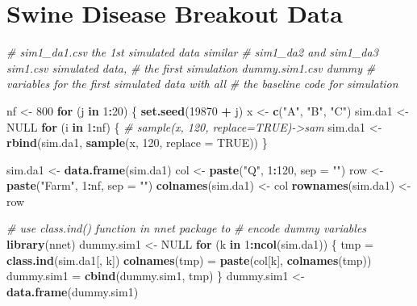 \documentclass[12pt,]{krantz}
\makeatletter
\newenvironment{Shaded}{\begin{snugshade}}{\end{snugshade}}
\newcommand{\CommentTok}[1]{\textcolor[rgb]{0.37,0.37,0.37}{\textit{#1}}}
\newcommand{\ControlFlowTok}[1]{\textcolor[rgb]{0.27,0.27,0.27}{\textbf{#1}}}
\newcommand{\DataTypeTok}[1]{\textcolor[rgb]{0.27,0.27,0.27}{#1}}
\newcommand{\DecValTok}[1]{\textcolor[rgb]{0.06,0.06,0.06}{#1}}
\newcommand{\KeywordTok}[1]{\textcolor[rgb]{0.27,0.27,0.27}{\textbf{#1}}}
\newcommand{\NormalTok}[1]{#1}
\newcommand{\OperatorTok}[1]{\textcolor[rgb]{0.43,0.43,0.43}{\textbf{#1}}}
\newcommand{\OtherTok}[1]{\textcolor[rgb]{0.37,0.37,0.37}{#1}}
\newcommand{\StringTok}[1]{\textcolor[rgb]{0.5,0.5,0.5}{#1}}
\newenvironment{kframe}{%
\medskip{}
\setlength{\fboxsep}{.8em}
 \def\at@end@of@kframe{}%
 \ifinner\ifhmode%
  \def\at@end@of@kframe{\end{minipage}}%
  \begin{minipage}{\columnwidth}%
 \fi\fi%
 \def\FrameCommand##1{\hskip\@totalleftmargin \hskip-\fboxsep
 \colorbox{shadecolor}{##1}\hskip-\fboxsep
     \hskip-\linewidth \hskip-\@totalleftmargin \hskip\columnwidth}%
 \MakeFramed {\advance\hsize-\width
   \@totalleftmargin\z@ \linewidth\hsize
   \@setminipage}}%
 {\par\unskip\endMakeFramed%
 \at@end@of@kframe}
\renewenvironment{Shaded}{\begin{kframe}}{\end{kframe}}
\makeatother
\begin{document}
\hypertarget{swine-disease-breakout-data}{%
\section{Swine Disease Breakout Data}\label{swine-disease-breakout-data}}

\begin{Shaded}
\begin{Highlighting}[]
\CommentTok{# sim1_da1.csv the 1st simulated data similar}
\CommentTok{# sim1_da2 and sim1_da3 sim1.csv simulated data,}
\CommentTok{# the first simulation dummy.sim1.csv dummy}
\CommentTok{# variables for the first simulated data with all}
\CommentTok{# the baseline code for simulation}

\NormalTok{nf <-}\StringTok{ }\DecValTok{800}
\ControlFlowTok{for}\NormalTok{ (j }\ControlFlowTok{in} \DecValTok{1}\OperatorTok{:}\DecValTok{20}\NormalTok{) \{}
    \KeywordTok{set.seed}\NormalTok{(}\DecValTok{19870} \OperatorTok{+}\StringTok{ }\NormalTok{j)}
\NormalTok{    x <-}\StringTok{ }\KeywordTok{c}\NormalTok{(}\StringTok{"A"}\NormalTok{, }\StringTok{"B"}\NormalTok{, }\StringTok{"C"}\NormalTok{)}
\NormalTok{    sim.da1 <-}\StringTok{ }\OtherTok{NULL}
    \ControlFlowTok{for}\NormalTok{ (i }\ControlFlowTok{in} \DecValTok{1}\OperatorTok{:}\NormalTok{nf) \{}
        \CommentTok{# sample(x, 120, replace=TRUE)->sam}
\NormalTok{        sim.da1 <-}\StringTok{ }\KeywordTok{rbind}\NormalTok{(sim.da1, }\KeywordTok{sample}\NormalTok{(x, }\DecValTok{120}\NormalTok{, }\DataTypeTok{replace =} \OtherTok{TRUE}\NormalTok{))}
\NormalTok{    \}}
    
\NormalTok{    sim.da1 <-}\StringTok{ }\KeywordTok{data.frame}\NormalTok{(sim.da1)}
\NormalTok{    col <-}\StringTok{ }\KeywordTok{paste}\NormalTok{(}\StringTok{"Q"}\NormalTok{, }\DecValTok{1}\OperatorTok{:}\DecValTok{120}\NormalTok{, }\DataTypeTok{sep =} \StringTok{""}\NormalTok{)}
\NormalTok{    row <-}\StringTok{ }\KeywordTok{paste}\NormalTok{(}\StringTok{"Farm"}\NormalTok{, }\DecValTok{1}\OperatorTok{:}\NormalTok{nf, }\DataTypeTok{sep =} \StringTok{""}\NormalTok{)}
    \KeywordTok{colnames}\NormalTok{(sim.da1) <-}\StringTok{ }\NormalTok{col}
    \KeywordTok{rownames}\NormalTok{(sim.da1) <-}\StringTok{ }\NormalTok{row}
    
    \CommentTok{# use class.ind() function in nnet package to}
    \CommentTok{# encode dummy variables}
    \KeywordTok{library}\NormalTok{(nnet)}
\NormalTok{    dummy.sim1 <-}\StringTok{ }\OtherTok{NULL}
    \ControlFlowTok{for}\NormalTok{ (k }\ControlFlowTok{in} \DecValTok{1}\OperatorTok{:}\KeywordTok{ncol}\NormalTok{(sim.da1)) \{}
\NormalTok{        tmp =}\StringTok{ }\KeywordTok{class.ind}\NormalTok{(sim.da1[, k])}
        \KeywordTok{colnames}\NormalTok{(tmp) =}\StringTok{ }\KeywordTok{paste}\NormalTok{(col[k], }\KeywordTok{colnames}\NormalTok{(tmp))}
\NormalTok{        dummy.sim1 =}\StringTok{ }\KeywordTok{cbind}\NormalTok{(dummy.sim1, tmp)}
\NormalTok{    \}}
\NormalTok{    dummy.sim1 <-}\StringTok{ }\KeywordTok{data.frame}\NormalTok{(dummy.sim1)}
    

\end{Highlighting}
\end{Shaded}
\end{document}
